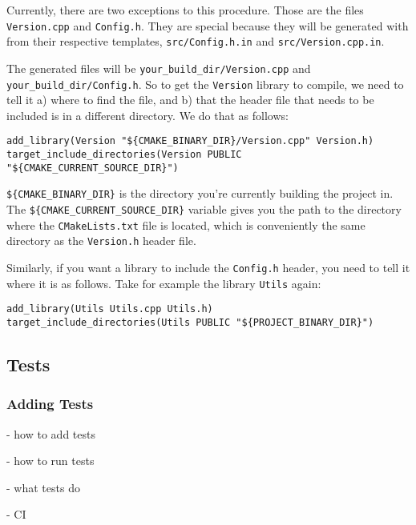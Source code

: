Currently, there are two exceptions to this procedure. Those are the files
\verb|Version.cpp| and \verb|Config.h|. They are special because they will be
generated with \cmake from their respective templates, \verb|src/Config.h.in|
and \verb|src/Version.cpp.in|.

The generated files will be \verb|your_build_dir/Version.cpp| and
\verb|your_build_dir/Config.h|.  So to get the \verb|Version| library to
compile, we need to tell it a) where to find the file, and b) that the header
file that needs to be included is in a different directory. We do that as
follows:


\begin{lstlisting}
add_library(Version "${CMAKE_BINARY_DIR}/Version.cpp" Version.h)
target_include_directories(Version PUBLIC "${CMAKE_CURRENT_SOURCE_DIR}")
\end{lstlisting}

\verb|${CMAKE_BINARY_DIR}| is the directory you're currently building the
project in. The \verb|${CMAKE_CURRENT_SOURCE_DIR}| variable gives you the path
to the directory where the \verb|CMakeLists.txt| file is located, which is
conveniently the same directory as the \verb|Version.h| header file.



Similarly, if you want a library to include the \verb|Config.h| header, you
need to tell it where it is as follows. Take for example the library
\verb|Utils| again:

\begin{lstlisting}
add_library(Utils Utils.cpp Utils.h)
target_include_directories(Utils PUBLIC "${PROJECT_BINARY_DIR}")
\end{lstlisting}





\subsection{Tests}

\subsubsection{Adding Tests}

- how to add tests

- how to run tests

- what tests do

- CI

